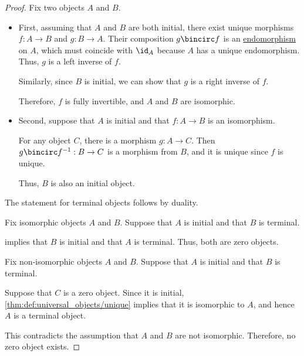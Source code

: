 \begin{proof}
   Fix two objects \( A \) and \( B \).

  \begin{itemize}
    \item First, assuming that \( A \) and \( B \) are both initial, there exist unique morphisms \( f: A \to B \) and \( g: B \to A \). Their composition \( g \bincirc f \) is an \hyperref[def:categorical_endomorphism]{endomorphism} on \( A \), which must coincide with \( \id_A \) because \( A \) has a unique endomorphism. Thus, \( g \) is a left inverse of \( f \).

    Similarly, since \( B \) is initial, we can show that \( g \) is a right inverse of \( f \).

    Therefore, \( f \) is fully invertible, and \( A \) and \( B \) are isomorphic.

    \item Second, suppose that \( A \) is initial and that \( f: A \to B \) is an isomorphism.

    For any object \( C \), there is a morphism \( g: A \to C \). Then \( g \bincirc f^{-1}: B \to C \) is a morphism from \( B \), and it is unique since \( f \) is unique.

    Thus, \( B \) is also an initial object.
  \end{itemize}

  The statement for terminal objects follows by duality.

   Fix isomorphic objects \( A \) and \( B \). Suppose that \( A \) is initial and that \( B \) is terminal.

   implies that \( B \) is initial and that \( A \) is terminal. Thus, both are zero objects.

   Fix non-isomorphic objects \( A \) and \( B \). Suppose that \( A \) is initial and that \( B \) is terminal.

  Suppose that \( C \) is a zero object. Since it is initial, \cref{thm:def:universal_objects/unique} implies that it is isomorphic to \( A \), and hence \( A \) is a terminal object.

  This contradicts the assumption that \( A \) and \( B \) are not isomorphic. Therefore, no zero object exists.
\end{proof}

